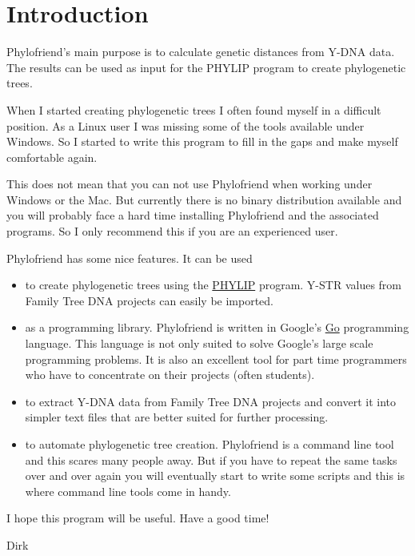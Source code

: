 \section{Introduction}

Phylofriend's main purpose is to calculate genetic distances from
Y-DNA data. The results can be used as input for the
PHYLIP\cite{Phylip} program to create phylogenetic trees.

When I started creating phylogenetic trees I often found
myself in a difficult position. As a Linux user I was missing
some of the tools available under Windows. So I started
to write this program to fill in the gaps and make myself
comfortable again.

This does not mean that you can not use Phylofriend when
working under Windows or the Mac. But currently there is
no binary distribution available and you will probably face
a hard time installing Phylofriend and the associated programs.
So I only recommend this if you are an experienced user.

Phylofriend has some nice features. It can be used

\begin{itemize}
\item to create phylogenetic trees using the
	\href{http://evolution.genetics.washington.edu/phylip.html}{PHYLIP}\cite{Phylip}
	program. Y-STR values from Family Tree DNA projects can
	easily be imported.
\item as a programming library. Phylofriend is written in
	Google's \href{http://golang.org/}{Go} programming
	language. This language is not only suited to solve
	Google's large scale programming problems. It is also
	an excellent tool for part time programmers who have
	to concentrate on their projects (often students).
\item to extract Y-DNA data from Family Tree DNA projects
	and convert it into simpler text files that are
	better suited for further processing.
\item to automate phylogenetic tree creation. Phylofriend
	is a command line tool and this scares many people
	away. But if you have to repeat the same tasks over
	and over again you will eventually start to write some
	scripts and this is where command line tools come in
	handy.
\end{itemize}

I hope this program will be useful. Have a good time!

\vspace{1em} Dirk



